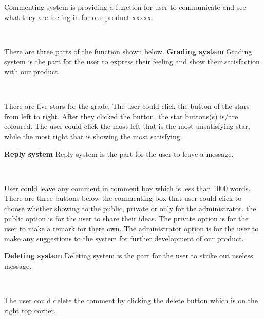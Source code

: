 Commenting system is providing a function for user to communicate and see what they are feeling in for our product xxxxx.\par~

There are three parts of the function shown below.
\textbf{Grading system}
Grading system is the part for the user to express their feeling and show their satisfaction with our product.\par~

There are five stars for the grade. The user could click the button of the stars from left to right. After they clicked the button, the star buttons(s) is/are coloured. The user could click the most left that is the most unsatisfying star, while the most right that is showing the most satisfying.

\textbf{Reply system}
Reply system is the part for the user to leave a message.\par~

User could leave any comment in comment box which is less than 1000 words. There are three buttons below the commenting box that user could click to choose whether showing to the public, private or only for the administrator. the public option is for the user to share their ideas. The private option is for the user to make a remark for there own. The administrator option is for the user to make any suggestions to the system for further development of our product.

\textbf{Deleting system}
Deleting system is the part for the user to strike out useless message.\par~

The user could delete the comment by clicking the delete button which is on the right top corner.
